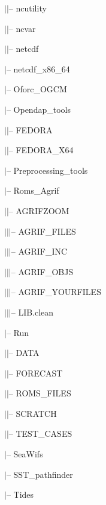 $|$\hspace{0.5cm}$|$-- ncutility

$|$\hspace{0.5cm}$|$-- ncvar

$|$\hspace{0.5cm}$|$-- netcdf

$|$-- netcdf\_x86\_64

$|$-- Oforc\_OGCM

$|$-- Opendap\_tools

$|$\hspace{0.5cm}$|$-- FEDORA

$|$\hspace{0.5cm}$|$-- FEDORA\_X64

$|$-- Preprocessing\_tools

$|$-- Roms\_Agrif

$|$\hspace{0.5cm}$|$-- AGRIFZOOM

$|$\hspace{0.5cm}$|$\hspace{0.5cm}$|$-- AGRIF\_FILES

$|$\hspace{0.5cm}$|$\hspace{0.5cm}$|$-- AGRIF\_INC

$|$\hspace{0.5cm}$|$\hspace{0.5cm}$|$-- AGRIF\_OBJS

$|$\hspace{0.5cm}$|$\hspace{0.5cm}$|$-- AGRIF\_YOURFILES

$|$\hspace{0.5cm}$|$\hspace{0.5cm}$|$-- LIB.clean

$|$-- Run

$|$\hspace{0.5cm}$|$-- DATA


$|$\hspace{0.5cm}$|$-- FORECAST

$|$\hspace{0.5cm}$|$-- ROMS\_FILES

$|$\hspace{0.5cm}$|$-- SCRATCH

$|$\hspace{0.5cm}$|$-- TEST\_CASES

$|$-- SeaWifs

$|$-- SST\_pathfinder

$|$-- Tides

